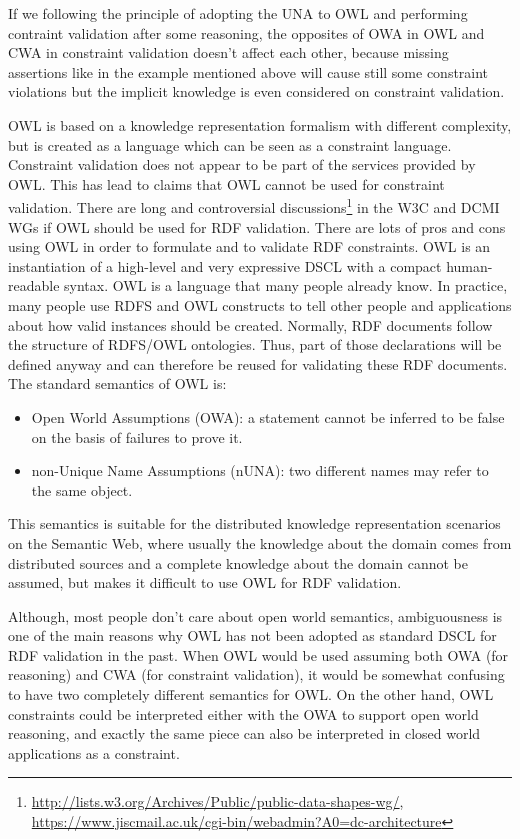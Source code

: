 \documentclass{llncs}
\newcommand{\tb}[1]{\todo[size=\small, color=green!40]{\textbf{Thomas:} #1}}
\begin{document}
If we following the principle of adopting the UNA to OWL and performing contraint validation after some reasoning, the opposites of OWA in OWL and CWA in constraint validation doesn't affect each other, because missing assertions like in the example mentioned above will cause still some constraint violations but the implicit knowledge is even considered on constraint validation.




\tb{1 simple example in motivation section}

OWL is based on a knowledge representation formalism with different complexity, but is created as a language which can be seen as a constraint language.
Constraint validation does not appear to be part of the services provided by OWL.  
This has lead to claims that OWL cannot be used for constraint validation. 
There are long and controversial discussions\footnote{\url{http://lists.w3.org/Archives/Public/public-data-shapes-wg/}, \url{https://www.jiscmail.ac.uk/cgi-bin/webadmin?A0=dc-architecture}} in the W3C and DCMI WGs if OWL should be used for RDF validation.
There are lots of pros and cons using OWL in order to formulate and to validate RDF constraints.
OWL is an instantiation of a high-level and very expressive DSCL with a compact human-readable syntax.
OWL is a language that many people already know.
In practice, many people use RDFS and OWL constructs to tell other people and applications about how valid instances should be created.
Normally, RDF documents follow the structure of RDFS/OWL ontologies. 
Thus, part of those declarations will be defined anyway and can therefore be reused for validating these RDF documents.
The standard semantics of OWL is:

\begin{itemize}
	\item Open World Assumptions (OWA): a statement cannot be inferred to be false on the basis of failures to prove it.
  \item non-Unique Name Assumptions (nUNA): two different names may refer to the same object.
\end{itemize}

This semantics is suitable for the distributed knowledge representation scenarios on the Semantic Web, 
where usually the knowledge about the domain comes from distributed
sources and a complete knowledge about the domain cannot be assumed, 
but makes it difficult to use OWL for RDF validation.

Although, most people don’t care about open world semantics, 
ambiguousness is one of the main reasons why OWL has not been adopted as standard DSCL for RDF validation in the past. 
When OWL would be used assuming both OWA (for reasoning) and CWA (for constraint validation),
it would be somewhat confusing to have two completely different semantics for OWL.
On the other hand, OWL constraints could be interpreted either with the OWA to support open
world reasoning, and exactly the same piece can also be interpreted in closed world
applications as a constraint. 
\end{document}
